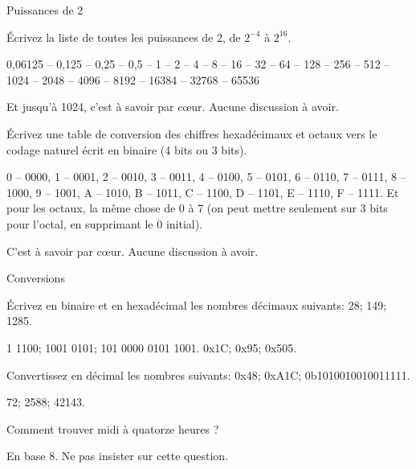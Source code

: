 \begin{exercice}
  \begin{exercicelet}{Puissances de 2}
    \begin{questions}
    \item Écrivez la liste de toutes les puissances de 2, de $2^{-4}$ à
      $2^{16}$.
      \begin{xcorrection} 0,06125 -- 0,125 -- 0,25 -- 0,5 -- 1 -- 2 -- 4 -- 8
        -- 16 -- 32 -- 64 -- 128 -- 256 -- 512 -- 1024 -- 2048 -- 4096 -- 8192
        -- 16384 -- 32768 -- 65536

        Et jusqu'à 1024, c'est à savoir par c\oe ur. Aucune discussion à
        avoir.
      \end{xcorrection}
    \item Écrivez une table de conversion des chiffres hexadécimaux et
      octaux vers le codage naturel écrit en binaire (4 bits ou 3 bits).
      \begin{xcorrection} 0 -- 0000, 1 -- 0001, 2 -- 0010, 3 -- 0011, 4 --
        0100, 5 -- 0101, 6 -- 0110, 7 -- 0111, 8 -- 1000, 9 -- 1001, A -- 1010,
        B -- 1011, C -- 1100, D -- 1101, E -- 1110, F -- 1111. Et pour les
        octaux, la même chose de 0 à 7 (on peut mettre seulement sur 3 bits pour
        l'octal, en supprimant le 0 initial).

        C'est à savoir par c\oe ur. Aucune discussion à avoir.
      \end{xcorrection}
    \end{questions}
  \end{exercicelet}
  \begin{exercicelet}{Conversions}
    \begin{questions}
    \item Écrivez en binaire et en hexadécimal les nombres décimaux
      suivants: 28; 149; 1285.
      \begin{xcorrection}
        1 1100; 1001 0101; 101 0000 0101 1001.
        0x1C; 0x95; 0x505.
      \end{xcorrection}
    \item Convertissez en décimal les nombres suivants: 0x48; 0xA1C; 0b1010010010011111.
      \begin{xcorrection}
        72; 2588; 42143.
      \end{xcorrection}
    \item Comment trouver midi à quatorze heures ?
      \begin{xcorrection}En base 8. Ne pas insister sur cette
        question.\end{xcorrection}
    \end{questions}
  \end{exercicelet}
\end{exercice}
